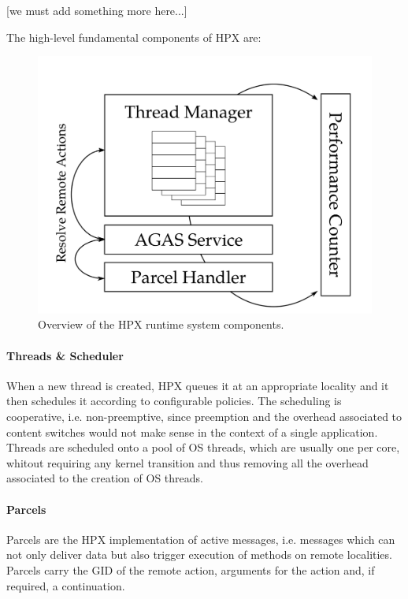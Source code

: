 [\TODO we must add something more here...]

The high-level fundamental components of HPX are:

\begin{figure}[b]
 	\begin{center}
 		\includegraphics[scale=0.15]{Figures/hpxArchitecture.png}
 		\caption{Overview of the HPX runtime system components\cite{heller2017hpx}.}\label{fig:hpxArchitecture}
 	\end{center}
\end{figure}

\paragraph{Threads \& Scheduler}
When a new thread is created, HPX queues it at an appropriate locality and it then schedules it according to configurable policies. The scheduling is cooperative, i.e. non-preemptive, since preemption and the overhead associated to content switches would not make sense in the context of a single application. Threads are scheduled onto a pool of OS threads, which are usually one per core, whitout requiring any kernel transition and thus removing all the overhead associated to the creation of OS threads.

\paragraph{Parcels}
Parcels are the HPX implementation of active messages, i.e. messages which can not only deliver data but also trigger execution of methods on remote localities.
Parcels carry the GID of the remote action, arguments for the action and, if required, a continuation.

